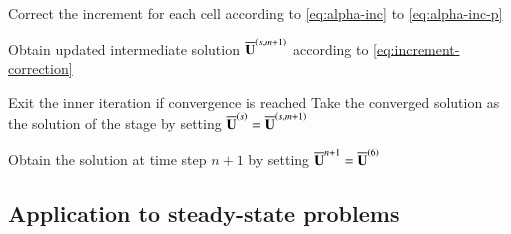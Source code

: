 \begin{algorithm}[htbp!]
\begin{algorithmic}[1]
        \State Correct the increment for each cell according to \eqref{eq:alpha-inc} to \eqref{eq:alpha-inc-p}

        \State Obtain updated intermediate solution $\overline{\mathbf{U}}^{\left(s,m+1\right)}$ according to \eqref{eq:increment-correction} %

        \State Exit the inner iteration if convergence is reached
		\EndFor
        \State Take the converged solution as the solution of the stage by setting $\overline{\mathbf{U}}^{\left(s\right)}=\overline{\mathbf{U}}^{\left(s,m+1\right)}$ %
		\EndFor
 	
        \State Obtain the solution at time step $n+1$ by setting $\overline{\mathbf{U}}^{n+1} =\overline{\mathbf{U}}^{\left(6\right)}$ %

 	\EndFunction 
 		
 		
 		
 		
 		
 		
 		
 	\end{algorithmic}  
 \end{algorithm}  

 

\subsection{Application to steady-state problems}
\label{ssec:application-to-steady-state}

